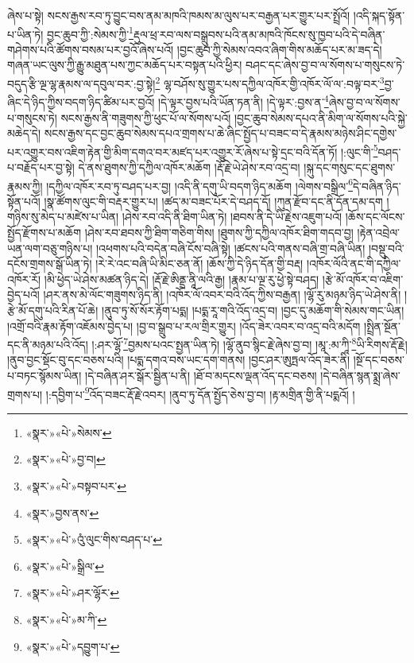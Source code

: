 ཞེས་པ་སྟེ། སངས་རྒྱས་རབ་ཏུ་བྱུང་བས་ནམ་མཁའི་ཁམས་མ་ལུས་པར་བརྒྱན་པར་གྱུར་པར་སྤྲོའོ། །འདི་སྐད་སྟོན་པ་ཡིན་ཏེ། བྱང་ཆུབ་ཀྱི་:སེམས་ཀྱི་\footnote{«སྣར་»«པེ་»སེམས་}རྡུལ་ཕྲ་རབ་ལས་བསྒྲུབས་པའི་ནམ་མཁའི་ཁོངས་སུ་ཁྱབ་པའི་དེ་བཞིན་གཤེགས་པའི་ཚོགས་བསམ་པར་བྱའོ་ཞེས་པའོ། །བྱང་ཆུབ་ཀྱི་སེམས་འབའ་ཞིག་གིས་མཆོད་པར་མ་ཟད་དེ། གཞན་ཡང་ལུས་ཀྱི་རྒྱུ་མཐུན་པས་ཀྱང་མཆོད་པར་བསྟན་པའི་ཕྱིར། བཤང་དང་ཞེས་བྱ་བ་ལ་སོགས་པ་གསུངས་ཏེ་བདུད་རྩི་ལྔ་ལྷ་རྣམས་ལ་དབུལ་བར་:བྱ་སྟེ།\footnote{«སྣར་»«པེ་»བྱ་བ།} ལྷ་བཤོས་སུ་གྱུར་པས་དཀྱིལ་འཁོར་གྱི་འཁོར་ལོ་ལ་:བལྟ་བར་\footnote{«སྣར་»«པེ་»བསྟབ་པར་}བྱ་ཞིང་དེ་ཉིད་ཀྱིས་བདག་ཉིད་ཚིམ་པར་བྱའོ། །དེ་ལྟར་བྱས་པའི་ཡོན་ཏན་ནི། །དེ་ལྟར་:བྱས་ན་\footnote{«སྣར་»བྱས་ནས་}ཞེས་བྱ་བ་ལ་སོགས་པ་གསུངས་ཏེ། སངས་རྒྱས་ནི་གཟུགས་ཀྱི་ཕུང་པོ་ལ་སོགས་པའོ། །བྱང་ཆུབ་སེམས་དཔའ་ནི་མིག་ལ་སོགས་པའི་སྐྱེ་མཆེད་དེ། སངས་རྒྱས་དང་བྱང་ཆུབ་སེམས་དཔའ་གྲགས་པ་ཆེ་ཞིང་སྤྱོད་པ་བཟང་བ་དེ་རྣམས་མཉེས་ཤིང་དགྱེས་པར་འགྱུར་བས་འཇིག་རྟེན་གྱི་མིག་དགའ་བར་མཛད་པར་འགྱུར་རོ་ཞེས་པ་སྟེ་དྲང་བའི་དོན་ཏོ། །:ལུང་གི་\footnote{«སྣར་»«པེ་»འུཾ་ལུང་གིས་བཤད་པ་}བཤད་པ་བརྗོད་པར་བྱ་སྟེ། དེ་ནས་ཐུགས་ཀྱི་དཀྱིལ་འཁོར་མཆོག །རྡོ་རྗེ་ཡེ་ཤེས་རབ་འདྲ་བ། །སྐུ་དང་གསུང་དང་ཐུགས་རྣམས་ཀྱི། །དཀྱིལ་འཁོར་རབ་ཏུ་བཤད་པར་བྱ། །འདི་ནི་དགུ་ཡི་བདག་ཉིད་མཆོག །ལེགས་བསྒྲིལ་\footnote{«སྣར་»«པེ་»སྒྲིལ་}དེ་བཞིན་ཉིད་སྟོན་པའོ། །སྣ་ཚོགས་ལུང་གི་བརྡར་གྱུར་པ། །ཚད་མ་བཟང་པོར་དེ་བཤད་དོ། །ཀུན་རྫོབ་དང་ནི་དོན་དམ་དག །གཉིས་སུ་མེད་པ་མཛེས་པ་ཡིན། །ཤེས་རབ་འདི་ནི་ཐིག་ཡིན་ཏེ། །ཐབས་ནི་དེ་ཡི་རྗེས་འཇུག་པའོ། །ཆོས་དང་ལོངས་སྤྱོད་རྫོགས་པ་མཆོག །ཤེས་རབ་ཐབས་ཀྱི་ཐིག་གཅིག་གིས། །ཐུགས་ཀྱི་དཀྱིལ་འཁོར་ཐིག་གདབ་བྱ། །རྟེན་འབྲེལ་ཡན་ལག་བཅུ་གཉིས་པ། །འཕགས་པའི་བདེན་བཞི་ངོས་བཞི་སྟེ། །ཚངས་པའི་གནས་བཞི་གྲ་བཞི་ཡིན། །བསྡུ་བའི་དངོས་གྲགས་སྒོ་ཡིན་ཏེ། །རེ་རེ་འང་བཞི་ཡི་མིང་ཅན་ནོ། །ཆོས་ཀྱི་དེ་ཉིད་དོན་གྱི་བརྡ། །འཁོར་ལོའི་ནང་གི་དཀྱིལ་འཁོར་རོ། །མི་ཕྱེད་ཡེ་ཤེས་མཚན་ཉིད་དེ། །རྡོ་རྗེ་ཨིནྡྲ་ནཱི་ལའི་རྒྱ། །རྣམ་པ་ལྔ་རུ་ཕྱེ་སྟེ་བཤད། །རྩེ་མོ་འཁོར་བ་འཇིག་བྱེད་པའོ། །ཤར་ནས་མེ་ལོང་གཟུགས་ཉིད་ནི། །འཁོར་ལོ་འབར་བའི་འོད་ཀྱིས་བརྒྱན། །ལྷོ་རུ་མཉམ་ཉིད་ཡེ་ཤེས་ནི། །རྩེ་མོ་དགུ་པའི་རིན་པོ་ཆེ། །ནུབ་ཏུ་སོ་སོར་རྟོག་པདྨ། །པདྨ་རཱ་གའི་འོད་འདྲ་བ། །བྱང་དུ་མཆོག་གི་སེམས་གང་ཡིན། །འགྲོ་བའི་རྣམ་རྟོག་འཇོམས་བྱེད་པ། །བྱ་བ་སྒྲུབ་པ་རལ་གྲིར་གྱུར། །འོད་ཟེར་འབར་བ་འདྲ་བའི་མདོག །སྤྲིན་སྔོན་དང་ནི་མཉམ་པའི་འོད། །:ཤར་ལྷོ་\footnote{«སྣར་»«པེ་»ཤར་ལྷོར་}བྱམས་པའང་སྤྱན་ཡིན་ཏེ། །ལྷོ་ནུབ་སྙིང་རྗེ་ཞེས་བྱ་བ། །མཱ་:མ་ཀཱི་\footnote{«སྣར་»«པེ་»མ་ཀི་}ཡི་རིགས་རྡོ་རྗེ། །ནུབ་བྱང་སྡོང་བུ་དང་བཅས་པའི། །པདྨ་དགའ་བས་ཡང་དག་གནས། །བྱང་ཤར་ཨུཏྤལ་འོད་ཟེར་ནི། །སྔོ་དང་བཅས་པ་བཏང་སྙོམས་ཡིན། །དེ་བཞིན་ཤར་སྒོར་སྦྱིན་པ་ནི། །ཐོ་བ་མདངས་ལྡན་འོད་དང་བཅས། །དེ་བཞིན་སྙན་སྨྲ་ཞེས་གྲགས་པ། །:དབྱིག་པ་\footnote{«སྣར་»«པེ་»དབྱུག་པ་}འོད་བཟང་རྡོ་རྗེ་འབར། །ནུབ་ཏུ་དོན་སྤྱོད་ཅེས་བྱ་བ། །རྟ་མགྲིན་གྱི་ནི་པདྨའོ། །
